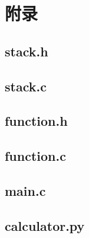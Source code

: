 \documentclass{DateStructure}
\begin{document}
\newpage 
\section{附录}
\subsection{stack.h}

\subsection{stack.c}

\subsection{function.h}

\subsection{function.c}

\subsection{main.c}

\subsection{calculator.py}

\end{document}
